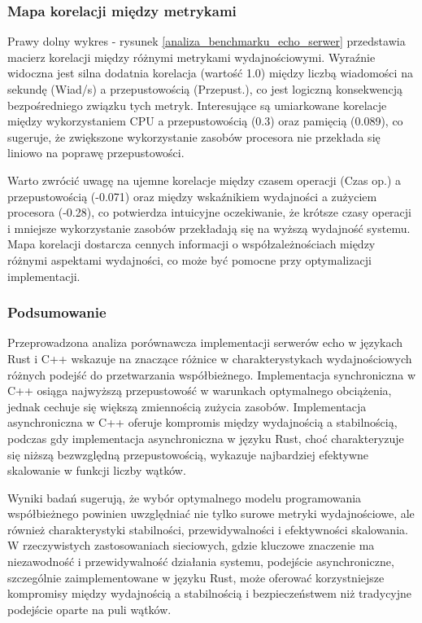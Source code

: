 \subsubsection{Mapa korelacji między metrykami}
Prawy dolny wykres - rysunek \ref{analiza_benchmarku_echo_serwer} przedstawia macierz korelacji między różnymi metrykami wydajnościowymi. Wyraźnie widoczna jest silna dodatnia korelacja (wartość 1.0) między liczbą wiadomości na sekundę (Wiad/s) a przepustowością (Przepust.), co jest logiczną konsekwencją bezpośredniego związku tych metryk. Interesujące są umiarkowane korelacje między wykorzystaniem CPU a przepustowością (0.3) oraz pamięcią (0.089), co sugeruje, że zwiększone wykorzystanie zasobów procesora nie przekłada się liniowo na poprawę przepustowości.

Warto zwrócić uwagę na ujemne korelacje między czasem operacji (Czas op.) a przepustowością (-0.071) oraz między wskaźnikiem wydajności a zużyciem procesora (-0.28), co potwierdza intuicyjne oczekiwanie, że krótsze czasy operacji i mniejsze wykorzystanie zasobów przekładają się na wyższą wydajność systemu. Mapa korelacji dostarcza cennych informacji o współzależnościach między różnymi aspektami wydajności, co może być pomocne przy optymalizacji implementacji.

\subsubsection{Podsumowanie}
Przeprowadzona analiza porównawcza implementacji serwerów echo w językach Rust i C++ wskazuje na znaczące różnice w charakterystykach wydajnościowych różnych podejść do przetwarzania współbieżnego. Implementacja synchroniczna w C++ osiąga najwyższą przepustowość w warunkach optymalnego obciążenia, jednak cechuje się większą zmiennością zużycia zasobów. Implementacja asynchroniczna w C++ oferuje kompromis między wydajnością a stabilnością, podczas gdy implementacja asynchroniczna w języku Rust, choć charakteryzuje się niższą bezwzględną przepustowością, wykazuje najbardziej efektywne skalowanie w funkcji liczby wątków.

Wyniki badań sugerują, że wybór optymalnego modelu programowania współbieżnego powinien uwzględniać nie tylko surowe metryki wydajnościowe, ale również charakterystyki stabilności, przewidywalności i efektywności skalowania. W rzeczywistych zastosowaniach sieciowych, gdzie kluczowe znaczenie ma niezawodność i przewidywalność działania systemu, podejście asynchroniczne, szczególnie zaimplementowane w języku Rust, może oferować korzystniejsze kompromisy między wydajnością a stabilnością i bezpieczeństwem niż tradycyjne podejście oparte na puli wątków.

